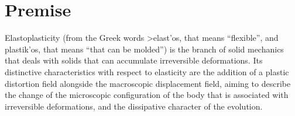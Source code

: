 \documentclass[a4paper,10pt,twoside]{amsbook}
\numberwithin{section}{chapter}
\numberwithin{equation}{chapter}
\theoremstyle{definition}
\begin{document}
% 

\chapter*{Premise}

Elastoplasticity (from the Greek words \foreignlanguage{greek}{>elast'os}, that means ``flexible'', and \foreignlanguage{greek}{plastik'os}, that means ``that can be molded'') is the branch of solid mechanics that deals with solids that can accumulate irreversible deformations. Its distinctive characteristics with respect to elasticity are the addition of a plastic distortion field alongside the macroscopic displacement field, aiming to describe the change of the microscopic configuration of the body that is associated with irreversible deformations, and the dissipative character of the evolution.
\end{document}
